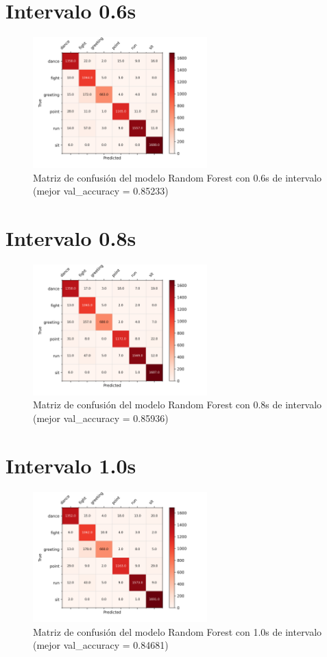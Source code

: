 \section{Intervalo 0.6s}

\begin{figure}[H]
    \centering
    \includegraphics[width=0.6\textwidth]{Imagenes/Bitmap/CM_best_rf_0.6.png}
    \caption{Matriz de confusión del modelo Random Forest con 0.6s de intervalo (mejor val\_accuracy = 0.85233)}
    \label{fig:rf-0.6-matriz}
\end{figure}

\section{Intervalo 0.8s}

\begin{figure}[H]
    \centering
    \includegraphics[width=0.6\textwidth]{Imagenes/Bitmap/CM_best_rf_0.8.png}
    \caption{Matriz de confusión del modelo Random Forest con 0.8s de intervalo (mejor val\_accuracy = 0.85936)}
    \label{fig:rf-0.8-matriz}
\end{figure}

\section{Intervalo 1.0s}

\begin{figure}[H]
    \centering
    \includegraphics[width=0.6\textwidth]{Imagenes/Bitmap/CM_best_rf_1.0.png}
    \caption{Matriz de confusión del modelo Random Forest con 1.0s de intervalo (mejor val\_accuracy = 0.84681)}
    \label{fig:rf-1.0-matriz}
\end{figure}